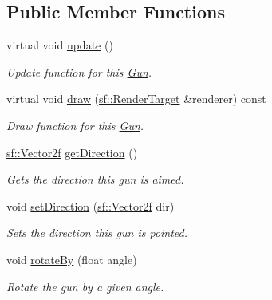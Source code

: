 \subsection*{Public Member Functions}
\begin{DoxyCompactItemize}
\item 
\mbox{\label{class_gun_a06d6e86fb21f2cb693ef2ad17ba4a720}} 
virtual void \mbox{\hyperlink{class_gun_a06d6e86fb21f2cb693ef2ad17ba4a720}{update}} ()
\begin{DoxyCompactList}\small\item\em Update function for this \mbox{\hyperlink{class_gun}{Gun}}. \end{DoxyCompactList}\item 
virtual void \mbox{\hyperlink{class_gun_a7944c121dad08710e89c4b118c790b11}{draw}} (\mbox{\hyperlink{classsf_1_1_render_target}{sf\+::\+Render\+Target}} \&renderer) const
\begin{DoxyCompactList}\small\item\em Draw function for this \mbox{\hyperlink{class_gun}{Gun}}. \end{DoxyCompactList}\item 
\mbox{\label{class_gun_a044cdd69d0c808dc4633e26b55a7a15a}} 
\mbox{\hyperlink{classsf_1_1_vector2}{sf\+::\+Vector2f}} \mbox{\hyperlink{class_gun_a044cdd69d0c808dc4633e26b55a7a15a}{get\+Direction}} ()
\begin{DoxyCompactList}\small\item\em Gets the direction this gun is aimed. \end{DoxyCompactList}\item 
\mbox{\label{class_gun_afe96aadaf4aebb3e231aa6d0310ed95c}} 
void \mbox{\hyperlink{class_gun_afe96aadaf4aebb3e231aa6d0310ed95c}{set\+Direction}} (\mbox{\hyperlink{classsf_1_1_vector2}{sf\+::\+Vector2f}} dir)
\begin{DoxyCompactList}\small\item\em Sets the direction this gun is pointed. \end{DoxyCompactList}\item 
void \mbox{\hyperlink{class_gun_ac33af2c44dffe022a1446b235e2ba034}{rotate\+By}} (float angle)
\begin{DoxyCompactList}\small\item\em Rotate the gun by a given angle. \end{DoxyCompactList}\item 

\end{DoxyCompactItemize}
